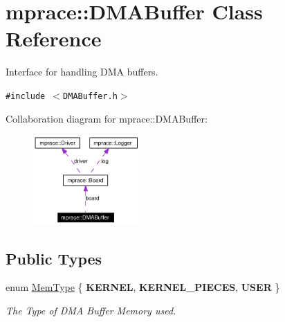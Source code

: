 \hypertarget{classmprace_1_1DMABuffer}{
\section{mprace::DMABuffer Class Reference}
\label{classmprace_1_1DMABuffer}
}
Interface for handling DMA buffers.  


{\tt \#include $<$DMABuffer.h$>$}

Collaboration diagram for mprace::DMABuffer:\begin{figure}[H]
\begin{center}
\leavevmode
\includegraphics[width=115pt]{classmprace_1_1DMABuffer__coll__graph}
\end{center}
\end{figure}
\subsection*{Public Types}
\begin{CompactItemize}
\item 
enum \hyperlink{classmprace_1_1DMABuffer_w3}{Mem\-Type} \{ {\bf KERNEL}, 
{\bf KERNEL\_\-PIECES}, 
{\bf USER}
 \}
\begin{CompactList}\small\item\em The Type of DMA Buffer Memory used. \item\end{CompactList}\end{CompactItemize}
